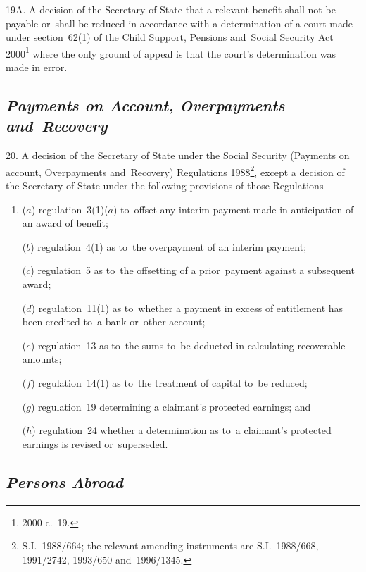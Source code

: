 \documentclass[12pt,a4paper]{article}
\begin{document}
19A.  A decision of the Secretary of State that a relevant benefit shall not be payable or~shall be reduced in accordance with a determination of a court made under section~62(1) of the Child Support, Pensions and~Social Security Act 2000\footnote{2000 c.\ 19.} where the only ground of appeal is that the court’s determination was made in error.


\subsection*{\itshape Payments on Account, Overpayments and~Recovery}

20.  A decision of the Secretary of State under the Social Security (Payments on account, Overpayments and~Recovery) Regulations 1988\footnote{\frenchspacing S.I.~1988/664; the relevant amending instruments are S.I.~1988/668, 1991/2742, 1993/650 and~1996/1345.}, except a decision of the Secretary of State under the following provisions of those Regulations—
\begin{enumerate}\item[]
($a$) regulation~3(1)($a$) to~offset any interim payment made in anticipation of an award of benefit;

($b$) regulation~4(1) as to~the overpayment of an interim payment;

($c$) regulation~5 as to~the offsetting of a prior~payment against a subsequent award;

($d$) regulation~11(1) as to~whether a payment in excess of entitlement has been credited to~a bank or~other account;

($e$) regulation~13 as to~the sums to~be deducted in calculating recoverable amounts;

($f$) regulation~14(1) as to~the treatment of capital to~be reduced;

($g$) regulation~19 determining a claimant’s protected earnings; and

($h$) regulation~24 whether a determination as to~a claimant’s protected earnings is revised or~superseded.
\end{enumerate}

\subsection*{\itshape Persons Abroad}
\end{document}
